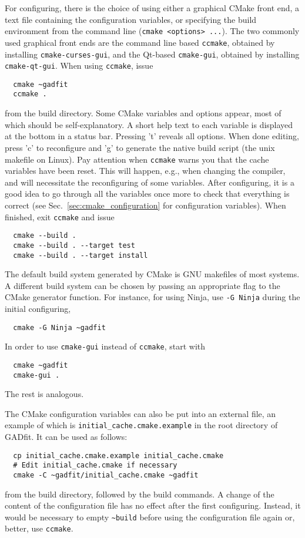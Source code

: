 \documentclass{article}
\begin{document}
For configuring, there is the choice of using either a graphical CMake front end, a text file containing the configuration variables, or specifying the build environment from the command line (\verb+cmake <options> ...+). The two commonly used graphical front ends are the command line based \texttt{ccmake}, obtained by installing \texttt{cmake-curses-gui}, and the Qt-based \texttt{cmake-gui}, obtained by installing \texttt{cmake-qt-gui}. When using \texttt{ccmake}, issue
\begin{verbatim}
  cmake ~gadfit
  ccmake .
\end{verbatim}
from the build directory. Some CMake variables and options appear, most of which should be self-explanatory. A short help text to each variable is displayed at the bottom in a status bar. Pressing 't' reveals all options. When done editing, press 'c' to reconfigure and 'g' to generate the native build script (the unix makefile on Linux). Pay attention when \texttt{ccmake} warns you that the cache variables have been reset. This will happen, e.g., when changing the compiler, and will necessitate the reconfiguring of some variables. After configuring, it is a good idea to go through all the variables once more to check that everything is correct (see Sec.~\ref{sec:cmake_configuration} for configuration variables). When finished, exit \texttt{ccmake} and issue
\begin{verbatim}
  cmake --build .
  cmake --build . --target test
  cmake --build . --target install
\end{verbatim}
The default build system generated by CMake is GNU makefiles of most systems. A different build system can be chosen by passing an appropriate flag to the CMake generator function. For instance, for using Ninja, use \texttt{-G Ninja} during the initial configuring,
\begin{verbatim}
  cmake -G Ninja ~gadfit
\end{verbatim}
In order to use \texttt{cmake-gui} instead of \texttt{ccmake}, start with
\begin{verbatim}
  cmake ~gadfit
  cmake-gui .
\end{verbatim}
The rest is analogous.

The CMake configuration variables can also be put into an external file, an example of which is \verb+initial_cache.cmake.example+ in the root directory of GADfit. It can be used as follows:
\begin{verbatim}
  cp initial_cache.cmake.example initial_cache.cmake
  # Edit initial_cache.cmake if necessary
  cmake -C ~gadfit/initial_cache.cmake ~gadfit
\end{verbatim}
from the build directory, followed by the build commands. A change of the content of the configuration file has no effect after the first configuring. Instead, it would be necessary to empty \verb+~build+ before using the configuration file again or, better, use \texttt{ccmake}.
\end{document}
